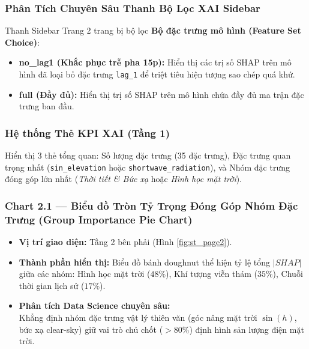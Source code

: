 \documentclass[12pt,a4paper]{article}
\begin{document}
\subsubsection{Phân Tích Chuyên Sâu Thanh Bộ Lọc XAI Sidebar}
Thanh Sidebar Trang 2 trang bị bộ lọc \textbf{Bộ đặc trưng mô hình (Feature Set Choice)}:
\begin{itemize}
    \item \textbf{no\_lag1 (Khắc phục trễ pha 15p):} Hiển thị các trị số SHAP trên mô hình đã loại bỏ đặc trưng \texttt{lag\_1} để triệt tiêu hiện tượng sao chép quá khứ.
    \item \textbf{full (Đầy đủ):} Hiển thị trị số SHAP trên mô hình chứa đầy đủ ma trận đặc trưng ban đầu.
\end{itemize}

\subsubsection{Hệ thống Thẻ KPI XAI (Tầng 1)}
Hiển thị 3 thẻ tổng quan: Số lượng đặc trưng (35 đặc trưng), Đặc trưng quan trọng nhất (\texttt{sin\_elevation} hoặc \texttt{shortwave\_radiation}), và Nhóm đặc trưng đóng góp lớn nhất (\textit{Thời tiết \& Bức xạ} hoặc \textit{Hình học mặt trời}).

\subsubsection{Chart 2.1 — Biểu đồ Tròn Tỷ Trọng Đóng Góp Nhóm Đặc Trưng (Group Importance Pie Chart)}
\begin{itemize}
    \item \textbf{Vị trí giao diện:} Tầng 2 bên phải (Hình \ref{fig:st_page2}).
    \item \textbf{Thành phần hiển thị:} Biểu đồ bánh doughnut thể hiện tỷ lệ tổng $|SHAP|$ giữa các nhóm: Hình học mặt trời ($48\%$), Khí tượng viễn thám ($35\%$), Chuỗi thời gian lịch sử ($17\%$).
    \item \textbf{Phân tích Data Science chuyên sâu:}\\ 
    Khẳng định nhóm đặc trưng vật lý thiên văn (góc nâng mặt trời $\sin(h)$, bức xạ clear-sky) giữ vai trò chủ chốt ($> 80\%$) định hình sản lượng điện mặt trời.
\end{itemize}
\end{document}

